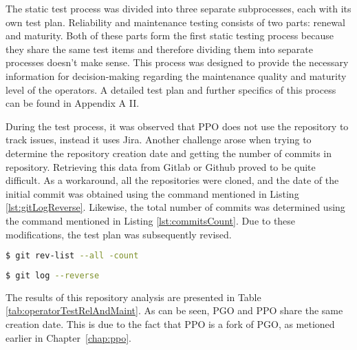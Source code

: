 The static test process was divided into three separate subprocesses, each with its own test plan.
\label{chap:testReliabilityAndMaintenance}
Reliability and maintenance testing consists of two parts: renewal and maturity. Both of these parts form the first static testing process because they share the same test items and therefore dividing them into separate processes doesn't make sense. This process was designed to provide the necessary information for decision-making regarding the maintenance quality and maturity level of the operators. A detailed test plan and further specifics of this process can be found in Appendix A II.

During the test process, it was observed that PPO does not use the repository to track issues, instead it uses Jira. Another challenge arose when trying to determine the repository creation date and getting the number of commits in repository. Retrieving this data from Gitlab or Github proved to be quite difficult. As a workaround, all the repositories were cloned, and the date of the initial commit was obtained using the command mentioned in Listing \ref{lst:gitLogReverse}.
Likewise, the total number of commits was determined using the command mentioned in Listing \ref{lst:commitsCount}. Due to these modifications, the test plan was subsequently revised.

\begin{lstlisting}[language=bash, caption={Commits count}, label={lst:commitsCount}]
        $ git rev-list --all -count
    \end{lstlisting}

\begin{lstlisting}[language=bash, caption={Reverse git log}, label={lst:gitLogReverse}]
        $ git log --reverse
\end{lstlisting}

The results of this repository analysis are presented in Table \ref{tab:operatorTestRelAndMaint}. As can be seen, PGO and PPO share the same creation date. This is due to the fact that PPO is a fork of PGO, as metioned earlier in Chapter~\ref{chap:ppo}.


